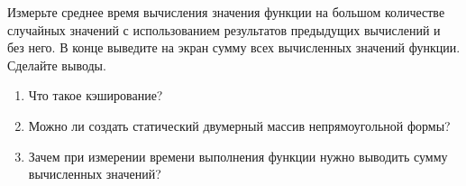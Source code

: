 \labtask

Измерьте среднее время вычисления значения функции на большом количестве случайных значений с использованием результатов предыдущих вычислений и без него.
В конце выведите на экран сумму всех вычисленных значений функции.
Сделайте выводы.

\labworkquestions

\begin{enumerate}
	\item
		Что такое кэширование?
	\item
		Можно ли создать статический двумерный массив непрямоугольной формы?
	\item
		Зачем при измерении времени выполнения функции нужно выводить сумму вычисленных значений?
\end{enumerate}




